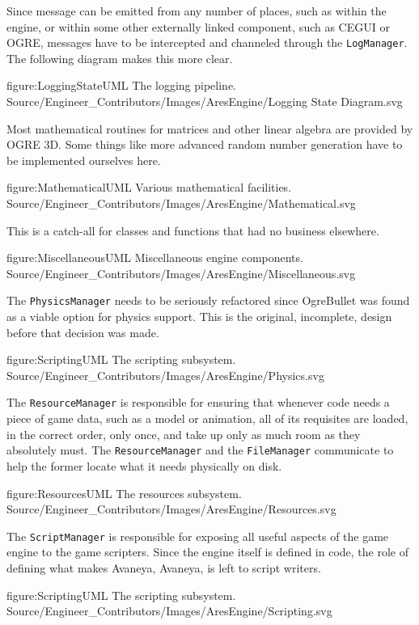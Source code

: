 Since message can be emitted from any number of places, such as within the engine, or within some other externally linked component, such as CEGUI or OGRE, messages have to be intercepted and channeled through the {\tt LogManager}. The following diagram makes this more clear.

\FullPageDiagram
    {figure:LoggingStateUML}
    {The logging pipeline.}
    {Source/Engineer_Contributors/Images/AresEngine/Logging State Diagram.svg}

\page 
{}
Most mathematical routines for matrices and other linear algebra are provided by OGRE 3D. Some things like more advanced random number generation have to be implemented ourselves here.

\FullPageDiagram
    {figure:MathematicalUML}
    {Various mathematical facilities.}
    {Source/Engineer_Contributors/Images/AresEngine/Mathematical.svg}

\page 
{}
This is a catch-all for classes and functions that had no business elsewhere.

\FullPageDiagram
    {figure:MiscellaneousUML}
    {Miscellaneous engine components.}
    {Source/Engineer_Contributors/Images/AresEngine/Miscellaneous.svg}

\page 
{}
The {\tt PhysicsManager} needs to be seriously refactored since OgreBullet was found as a viable option for physics support. This is the original, incomplete, design before that decision was made.

\FullPageDiagram
    {figure:ScriptingUML}
    {The scripting subsystem.}
    {Source/Engineer_Contributors/Images/AresEngine/Physics.svg}

\page 
{}
The {\tt ResourceManager} is responsible for ensuring that whenever code needs a piece of game data, such as a model or animation, all of its requisites are loaded, in the correct order, only once, and take up only as much room as they absolutely must. The {\tt ResourceManager} and the {\tt FileManager} communicate to help the former locate what it needs physically on disk.

\FullPageDiagram
    {figure:ResourcesUML}
    {The resources subsystem.}
    {Source/Engineer_Contributors/Images/AresEngine/Resources.svg}

\page 
{}
The {\tt ScriptManager} is responsible for exposing all useful aspects of the game engine to the game scripters. Since the engine itself is defined in code, the role of defining what makes Avaneya, Avaneya, is left to script writers.

\FullPageDiagram
    {figure:ScriptingUML}
    {The scripting subsystem.}
    {Source/Engineer_Contributors/Images/AresEngine/Scripting.svg}

